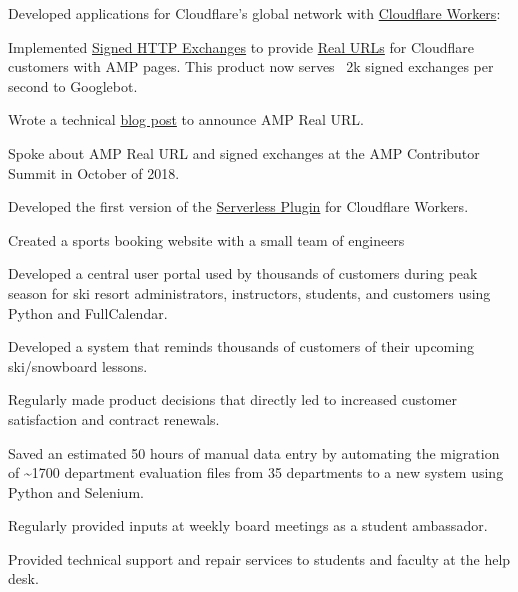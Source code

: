 \documentclass[]{deedy-resume-openfont}
\begin{document}
\vspace{\topsep}
Developed applications for Cloudflare's global network with  \href{https://workers.cloudflare.com}{Cloudflare Workers}:
\begin{tightemize}
\item Implemented \href{https://wicg.github.io/webpackage/draft-yasskin-http-origin-signed-responses.html}{Signed HTTP Exchanges} to provide \href{https://www.cloudflare.com/website-optimization/amp-real-url/}{Real URLs} for Cloudflare customers with AMP pages. This product now serves ~2k signed exchanges per second to Googlebot.
\item Wrote a technical \href{https://blog.cloudflare.com/real-urls-for-amp-cached-content-using-cloudflare-workers/}{blog post} to announce AMP Real URL.
\item Spoke about AMP Real URL and signed exchanges at the AMP Contributor Summit in October of 2018.
\item Developed the first version of the \href{https://developers.cloudflare.com/workers/tooling/serverless/}{Serverless Plugin} for Cloudflare Workers.
\end{tightemize}
\sectionsep

\vspace{\topsep}
Created a sports booking website with a small team of engineers
\begin{tightemize}
\item Developed a central user portal used by thousands of customers during peak season for ski resort administrators, instructors, students, and customers using Python and FullCalendar.
\item Developed a system that reminds thousands of customers of their upcoming ski/snowboard lessons.
\item Regularly made product decisions that directly led to increased customer satisfaction and contract renewals.
\end{tightemize}
\sectionsep

\begin{tightemize}
\item Saved an estimated 50 hours of manual data entry by automating the migration of \textasciitilde 1700 department evaluation files from 35 departments to a new system using Python and Selenium.
\item Regularly provided inputs at weekly board meetings as a student ambassador.
\item Provided technical support and repair services to students and faculty at the help desk.
\end{tightemize}
\sectionsep
\end{document}
